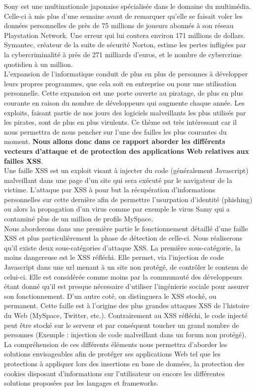 \documentclass[a4paper,12pt]{report}
\begin{document}
Sony est une multinationale japonaise spécialisée dans le domaine du multimédia. Celle-ci à mis plus d'une semaine avant de remarquer qu'elle se faisait voler les données personnelles de près de 75 millions de joueurs abonnés à son réseau Playstation Network. Une erreur qui lui coutera environ 171 millions de dollars. Symantec, créateur de la suite de sécurité Norton, estime les pertes infligées par la cybercriminalité à près de 271 milliards d'euros, et le nombre de cybercrime quotidien à un million.\\

L’expansion de l’informatique conduit de plus en plus de personnes à développer leurs propres programmes, que cela soit en entreprise ou pour une utilisation personnelle. Cette expansion est une porte ouverte au piratage, de plus en plus courante en raison du nombre de développeurs qui augmente chaque année. Les exploits, faisant partie de nos jours des logiciels malveillants les plus utilisés par les pirates, sont de plus en plus virulents.
Ce thème est très intéressant car il nous permettra de nous pencher sur l'une des failles les plus courantes du moment. \textbf{Nous allons donc dans ce rapport aborder les différents vecteurs d'attaque et de protection des applications Web relatives aux failles XSS}.\\

Une faille XSS est un exploit visant à injecter du code (généralement Javascript) malveillant dans une page d'un site qui sera exécuté par le navigateur de la victime. L'attaque par XSS à pour but la récupération d'informations personnelles sur cette dernière afin de permettre l'usurpation d'identité (phishing) ou alors la propagation d'un virus comme par exemple le virus Samy qui a contaminé plus de un million de profils MySpace. \\

Nous aborderons dans une première partie le fonctionnement détaillé d'une faille XSS et plus particulièrement la phase de détection de celle-ci. Nous réaliserons qu'il existe deux sous-catégories d'attaque XSS. La première sous-catégorie, la moins dangereuse est le XSS réfléchi. Elle permet, via l'injection de code Javascript dans une url menant à un site non protégé, de contrôler le contenu de celui-ci. Elle est considérée comme moins par la communauté des développeurs étant donné qu'il est presque nécessaire d'utiliser l'ingénierie sociale pour assurer son fonctionnement. D'un autre coté, on distinguera le XSS stocké, ou permanent. Cette faille est à l'origine des plus grandes attaques XSS de l'histoire du Web (MySpace, Twitter, etc.). Contrairement au XSS réfléchi, le code injecté peut être stocké sur le serveur et par conséquent toucher un grand nombre de personnes (Exemple : injection de code malveillant dans un forum non protégé). La compréhension de ces différents éléments nous permettra d'aborder les solutions envisageables afin de protéger ses applications Web tel que les protections à appliquer lors des insertions en base de données, la protection des cookies disposant d'informations sur l'utilisateur ou encore les différentes solutions proposées par les langages et frameworks.  \\
\end{document}
